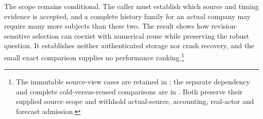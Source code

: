 The scope remains conditional. The caller must establish which source and timing evidence is accepted, and a complete history family for an actual company may require many more subjects than these two. The result shows how revision-sensitive selection can coexist with numerical reuse while preserving the robust question. It establishes neither authenticated storage nor crash recovery, and the small exact comparison supplies no performance ranking.\footnote{The immutable source-view cases are retained in ; the separate dependency and complete cold-versus-reused comparisons are in . Both preserve their supplied source scope and withhold actual-source, accounting, real-actor and forecast admission.}

